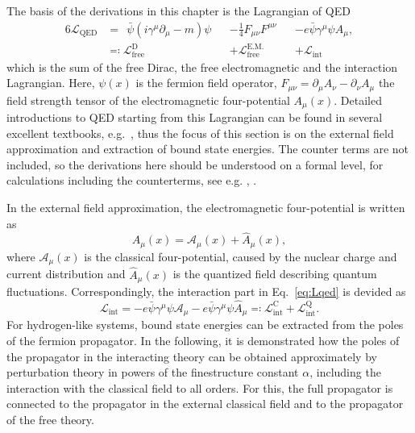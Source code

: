 The basis of the derivations in this chapter is the Lagrangian of QED
\begin{alignat}{6}
\label{eq:Lqed}
\mathcal{L}_{\text{QED}}&=\phantom{:}\bar{\psi}\left( i \gamma^\mu \partial_\mu -m  \right)\psi &&-\frac{1}{4}F_{\mu\nu}F^{\mu\nu}&&-e\bar{\psi}\gamma^\mu \psi A_\mu,\\
&\eqqcolon \mathcal{L}_{\text{free}}^{\text{D}} &&+ \mathcal{L}_{\text{free}}^{\text{E.M.}} &&+ \mathcal{L}_{\text{int}} \nonumber
\end{alignat}
which is the sum of the free Dirac, the free electromagnetic and the interaction Lagrangian. Here, $\psi(x)$ is the fermion field operator, $F_{\mu\nu}=\partial_\mu A_\nu - \partial_\nu A_\mu$ the field strength tensor of the electromagnetic four-potential $A_\mu(x)$. Detailed introductions to QED starting from this Lagrangian can be found in several excellent textbooks, e.g.~\cite{weinberg2005,itzykson2005,peskin1995}, thus the focus of this section is on the external field approximation and extraction of bound state energies. The counter terms are not included, so the derivations here should be understood on a formal level, for calculations including the counterterms, see e.g. \cite[Section 14]{weinberg2005}, \cite{shabaev2002}.

In the external field approximation, the electromagnetic four-potential is written as
\begin{equation}
A_\mu(x) = \mathcal{A}_\mu(x) + \hat{A}_\mu(x),
\end{equation}
where $\mathcal{A}_\mu(x)$ is the classical four-potential, caused by the nuclear charge and current distribution and $\hat{A}_\mu(x)$ is the quantized field describing quantum fluctuations. Correspondingly, the interaction part in Eq.~\eqref{eq:Lqed} is devided as
\begin{equation}
\label{eq:Lint}
\mathcal{L}_{\text{int}}=-e\bar{\psi}\gamma^\mu \psi \mathcal{A}_\mu-e\bar{\psi}\gamma^\mu \psi \hat{A}_\mu\eqqcolon\mathcal{L}_{\text{int}}^{\text{C}} + \mathcal{L}_{\text{int}}^{\text{Q}}.
\end{equation}
For hydrogen-like systems, bound state energies can be extracted from the poles of the fermion propagator. In the following, it is demonstrated how the poles of the propagator in the interacting theory can be obtained approximately by perturbation theory in powers of the finestructure constant $\alpha$, including the interaction with the classical field to all orders. For this, the full propagator is connected to the propagator in the external classical field and to the propagator of the free theory.
